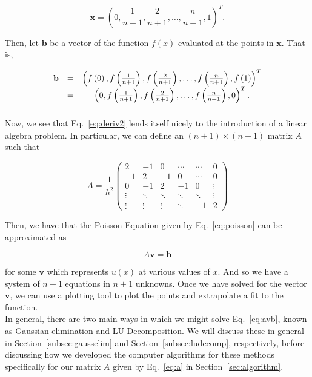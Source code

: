 \documentclass[12pt]{article}
\numberwithin{equation}{section}
\begin{document}
$$\textbf{x} = \left(0,\frac{1}{n+1},\frac{2}{n+1},\ldots,\frac{n}{n+1},1\right)^{T}.$$
\vspace{.2cm}

\noindent Then, let $\textbf{b}$ be a vector of the function $f\left(x\right)$ evaluated at the points in $\textbf{x}$.  That is,

$$\begin{array}{ccc}\textbf{b} &=& \left(f\left(0\right),f\left(\frac{1}{n+1}\right),f\left(\frac{2}{n+1}\right),\ldots,f\left(\frac{n}{n+1}\right),f\left(1\right)\right)^{T} \\ \vspace{.2cm}
&=& \left(0,f\left(\frac{1}{n+1}\right),f\left(\frac{2}{n+1}\right),\ldots,f\left(\frac{n}{n+1}\right),0\right)^{T}.
\end{array}$$
\vspace{.2cm}

\noindent Now, we see that Eq.~\ref{eq:deriv2} lends itself nicely to the introduction of a linear algebra problem.  In particular, we can define an $\left(n+1\right)\times \left(n+1\right)$ matrix $A$ such that

\vspace{.1cm}
\begin{equation}
\label{eq:a}
A = \frac{1}{h^{2}} \left(
\begin{array}{cccccc}
2 & -1 & 0 & \cdots & \cdots & 0 \\
-1 & 2 & -1 & 0 & \cdots & 0 \\
0 & -1 & 2 & -1 & 0 & \vdots \\
\vdots & \ddots & \ddots & \ddots & \ddots & \vdots \\
\vdots & \vdots & \vdots & \ddots & -1 & 2
\end{array}
\right)
\end{equation}
\vspace{.2cm}

\noindent Then, we have that the Poisson Equation given by Eq.~\ref{eq:poisson} can be approximated as 

\begin{equation}
\label{eq:avb}
A\textbf{v}=\textbf{b}
\end{equation}

\noindent for some $\textbf{v}$ which represents $u\left(x\right)$ at various values of $x$.  And so we have a system of $n+1$ equations in $n+1$ unknowns.  Once we have solved for the vector $\textbf{v}$, we can use a plotting tool to plot the points and extrapolate a fit to the function.
\\\indent In general, there are two main ways in which we might solve  Eq.~\ref{eq:avb}, known as Gaussian elimination and LU Decomposition.  We will discuss these in general in Section~\ref{subsec:gausselim} and Section~\ref{subsec:ludecomp}, respectively, before discussing how we developed the computer algorithms for these methods specifically for our matrix $A$ given by Eq.~\ref{eq:a} in Section~\ref{sec:algorithm}.
\end{document}
